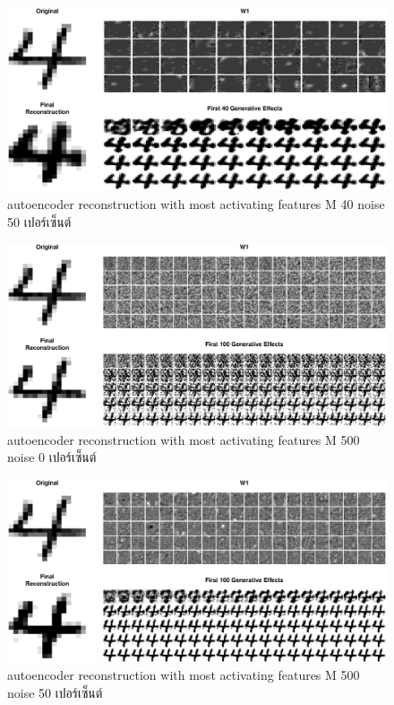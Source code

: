 %
\begin{figure}
\begin{center}
\includegraphics[width=6in]{04ANNDeep/ae04cGenEffects.eps}
\end{center}
\caption{autoencoder reconstruction with most activating features M 40 noise 50 เปอร์เซ็นต์}
\label{fig: deep autoencoder reconstruction with most activating features M 40 noise 50}
\end{figure}
%

%
\begin{figure}
\begin{center}
\includegraphics[width=6in]{04ANNDeep/ae06aGenEffects.eps}
\end{center}
\caption{autoencoder reconstruction with most activating features M 500 noise 0 เปอร์เซ็นต์}
\label{fig: deep autoencoder reconstruction with most activating features M 500 noise 0}
\end{figure}
%

%
\begin{figure}
\begin{center}
\includegraphics[width=6in]{04ANNDeep/ae06cGenEffects.eps}
\end{center}
\caption{autoencoder reconstruction with most activating features M 500 noise 50 เปอร์เซ็นต์}
\label{fig: deep autoencoder reconstruction with most activating features M 500 noise 0}
\end{figure}
%


